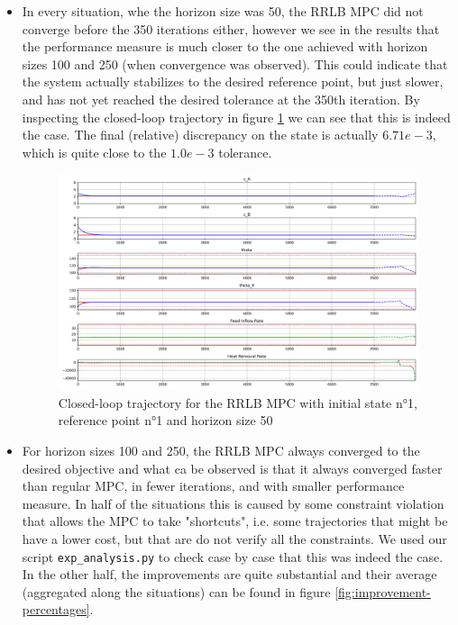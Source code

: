 \documentclass[12pt]{article}
\begin{document}
\begin{itemize}[label=\textbullet]
	\item In every situation, whe the horizon size was 50, the RRLB MPC did not converge before the 350 iterations either, however we see in the results that the performance measure is much closer to the one achieved with horizon sizes 100 and 250 (when convergence was observed).
	This could indicate that the system actually stabilizes to the desired reference point, but just slower, and has not yet reached the desired tolerance at the 350th iteration.
	By inspecting the closed-loop trajectory in figure \ref{fig:closedloop_traj_rrlb_1_1_50} we can see that this is indeed the case.
	The final (relative) discrepancy on the state is actually $6.71e-3$, which is quite close to the $1.0e-3$ tolerance.

	\begin{figure}[!ht]
		\centering
		\includegraphics[width=15cm]{images/closedloop_traj_rrlb_1_1_50.png}
		\caption{Closed-loop trajectory for the RRLB MPC with initial state n°1, reference point n°1 and horizon size 50}
		\label{fig:closedloop_traj_rrlb_1_1_50}
	\end{figure}

	\item For horizon sizes 100 and 250, the RRLB MPC always converged to the desired objective and what ca be observed is that it always converged faster than regular MPC, in fewer iterations, and with smaller performance measure.
	In half of the situations this is caused by some constraint violation that allows the MPC to take "shortcuts", i.e. some trajectories that might be have a lower cost, but that are do not verify all the constraints.
	We used our script \verb|exp_analysis.py| to check case by case that this was indeed the case.
	In the other half, the improvements are quite substantial and their average (aggregated along the situations) can be found in figure \ref{fig:improvement-percentages}.


\end{itemize}
\end{document}
